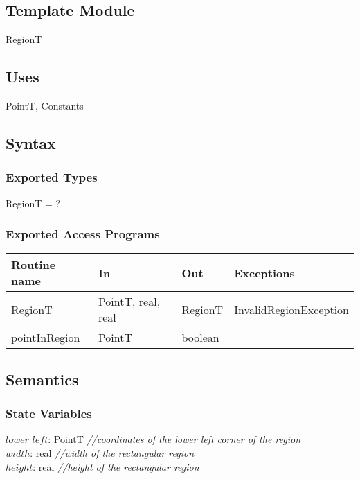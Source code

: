 \documentclass[12pt]{article}
\begin{document}
\subsection* {Template Module}

RegionT

\subsection* {Uses}

PointT, Constants

\subsection* {Syntax}

\subsubsection* {Exported Types}

RegionT = ?

\subsubsection* {Exported Access Programs}

\begin{tabular}{| l | l | l | l |}
\hline
\textbf{Routine name} & \textbf{In} & \textbf{Out} & \textbf{Exceptions}\\
\hline
RegionT & PointT, real, real & RegionT & InvalidRegionException\\
\hline
pointInRegion & PointT & boolean & ~\\
\hline 
\end{tabular}

\subsection* {Semantics}

\subsubsection* {State Variables}

$\mathit{lower\_left}$: PointT {\it //coordinates of the lower left corner of the region}\\
$\mathit{width}$: real {\it //width of the rectangular region}\\
$\mathit{height}$: real {\it //height of the rectangular region}
\end{document}
